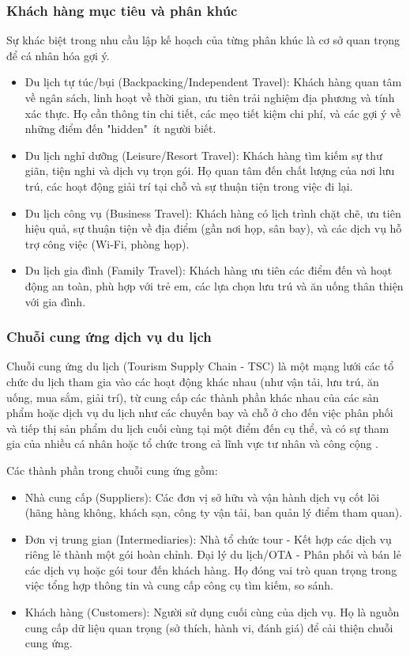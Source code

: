 \subsubsection{Khách hàng mục tiêu và phân khúc}
Sự khác biệt trong nhu cầu lập kế hoạch của từng phân khúc là cơ sở quan trọng để cá nhân hóa gợi ý.
\begin{itemize}
    \item Du lịch tự túc/bụi (Backpacking/Independent Travel): Khách hàng quan tâm về ngân sách, linh hoạt về thời gian, ưu tiên trải nghiệm địa phương và tính xác thực. Họ cần thông tin chi tiết, các mẹo tiết kiệm chi phí, và các gợi ý về những điểm đến "hidden"\ ít người biết.
    \item Du lịch nghỉ dưỡng (Leisure/Resort Travel): Khách hàng tìm kiếm sự thư giãn, tiện nghi và dịch vụ trọn gói. Họ quan tâm đến chất lượng của nơi lưu trú, các hoạt động giải trí tại chỗ và sự thuận tiện trong việc đi lại.
    \item Du lịch công vụ (Business Travel): Khách hàng có lịch trình chặt chẽ, ưu tiên hiệu quả, sự thuận tiện về địa điểm (gần nơi họp, sân bay), và các dịch vụ hỗ trợ công việc (Wi-Fi, phòng họp).
    \item Du lịch gia đình (Family Travel): Khách hàng ưu tiên các điểm đến và hoạt động an toàn, phù hợp với trẻ em, các lựa chọn lưu trú và ăn uống thân thiện với gia đình.
\end{itemize}

\subsubsection{Chuỗi cung ứng dịch vụ du lịch}
Chuỗi cung ứng du lịch (Tourism Supply Chain - TSC) là một mạng lưới các tổ chức du lịch tham gia vào các hoạt động khác nhau (như vận tải, lưu trú, ăn uống, mua sắm, giải trí), từ cung cấp các thành phần khác nhau của các sản phẩm hoặc dịch vụ du lịch như các chuyến bay và chỗ ở cho đến việc phân phối và tiếp thị sản phẩm du lịch cuối cùng tại một điểm đến cụ thể, và có sự tham gia của nhiều cá nhân hoặc tổ chức trong cả lĩnh vực tư nhân và công cộng \cite{vietnambiz2019_tsc}.

Các thành phần trong chuỗi cung ứng gồm:
\begin{itemize}
    \item Nhà cung cấp (Suppliers): Các đơn vị sở hữu và vận hành dịch vụ cốt lõi (hãng hàng không, khách sạn, công ty vận tải, ban quản lý điểm tham quan).
    \item Đơn vị trung gian (Intermediaries): Nhà tổ chức tour - Kết hợp các dịch vụ riêng lẻ thành một gói hoàn chỉnh. Đại lý du lịch/OTA - Phân phối và bán lẻ các dịch vụ hoặc gói tour đến khách hàng. Họ đóng vai trò quan trọng trong việc tổng hợp thông tin và cung cấp công cụ tìm kiếm, so sánh.
    \item Khách hàng (Customers): Người sử dụng cuối cùng của dịch vụ. Họ là nguồn cung cấp dữ liệu quan trọng (sở thích, hành vi, đánh giá) để cải thiện chuỗi cung ứng.
\end{itemize}

